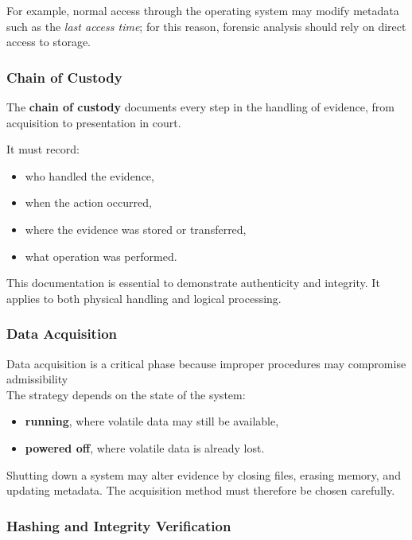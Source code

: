 \noindent
For example, normal access through the operating system may modify metadata such as the \textit{last access time}; for this reason, forensic analysis should rely on direct access to storage.

\subsubsection{Chain of Custody}

The \textbf{chain of custody} documents every step in the handling of evidence, from acquisition to presentation in court.

\noindent
It must record:

\begin{itemize}
\item who handled the evidence,
\item when the action occurred,
\item where the evidence was stored or transferred,
\item what operation was performed.
\end{itemize}

\noindent
This documentation is essential to demonstrate authenticity and integrity. It applies to both physical handling and logical processing.

\subsubsection{Data Acquisition}

Data acquisition is a critical phase because improper procedures may compromise admissibility
\\
The strategy depends on the state of the system:

\begin{itemize}
\item \textbf{running}, where volatile data may still be available,
\item \textbf{powered off}, where volatile data is already lost.
\end{itemize}

\noindent
Shutting down a system may alter evidence by closing files, erasing memory, and updating metadata. The acquisition method must therefore be chosen carefully.

\subsubsection{Hashing and Integrity Verification}

